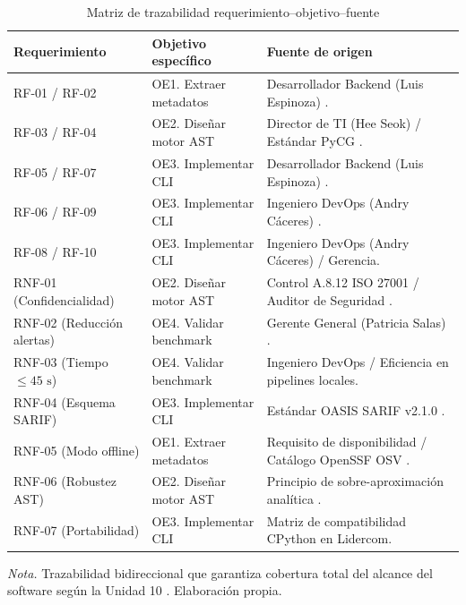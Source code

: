 \begin{table}[H]
\centering
\caption{Matriz de trazabilidad requerimiento--objetivo--fuente}
\label{tab:trazabilidad}
\small
{}
\begin{tabularx}{\textwidth}{>{\raggedright\arraybackslash}p{4.8cm} >{\raggedright\arraybackslash}p{4.6cm} X}
\toprule
\textbf{Requerimiento} & \textbf{Objetivo específico} & \textbf{Fuente de origen} \\
\midrule
RF-01 / RF-02 & OE1. Extraer metadatos & Desarrollador Backend (Luis Espinoza) \parencite{kendall2019systems}. \\ %
RF-03 / RF-04 & OE2. Diseñar motor AST & Director de TI (Hee Seok) / Estándar PyCG \parencite{salis2021pycg}. \\ %
RF-05 / RF-07 & OE3. Implementar CLI & Desarrollador Backend (Luis Espinoza) \parencite{wiegers2013software}. \\ %
RF-06 / RF-09 & OE3. Implementar CLI & Ingeniero DevOps (Andry Cáceres) \parencite{humble2010continuous}. \\ %
RF-08 / RF-10 & OE3. Implementar CLI & Ingeniero DevOps (Andry Cáceres) / Gerencia. \\ %
\addlinespace
RNF-01 (Confidencialidad) & OE2. Diseñar motor AST & Control A.8.12 ISO 27001 / Auditor de Seguridad \parencite{ladisa2023sok}. \\ %
RNF-02 (Reducción alertas) & OE4. Validar benchmark & Gerente General (Patricia Salas) \parencite{pashchenko2022vuln4real}. \\ %
RNF-03 (Tiempo $\le 45\text{ s}$) & OE4. Validar benchmark & Ingeniero DevOps / Eficiencia en pipelines locales. \\ %
RNF-04 (Esquema SARIF) & OE3. Implementar CLI & Estándar OASIS SARIF v2.1.0 \parencite{oasis2019sarif}. \\ %
RNF-05 (Modo offline) & OE1. Extraer metadatos & Requisito de disponibilidad / Catálogo OpenSSF OSV \parencite{openssf2023osv}. \\ %
RNF-06 (Robustez AST) & OE2. Diseñar motor AST & Principio de sobre-aproximación analítica \parencite{nielson1999principles}. \\ %
RNF-07 (Portabilidad) & OE3. Implementar CLI & Matriz de compatibilidad CPython en Lidercom. \\ %
\bottomrule
\end{tabularx}
\vspace{2pt}
\begin{flushleft}
\scriptsize \textit{Nota.} Trazabilidad bidireccional que garantiza cobertura total del alcance del software según la Unidad 10 \parencite{torres2026proyecto}. Elaboración propia. %
\end{flushleft}
\end{table}

